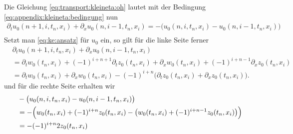 Die Gleichung \eqref{eq:transport:kleineta:oh} lautet mit der Bedingung \eqref{eq:appendix:kleineta:bedingung} nun
\begin{align*}
\partial_t u_0(n+1, i, t_n, x_i) + \partial_x u_0(n, i-1, t_n, x_i) = - \bigl( u_0(n, i, t_n, x_i) - u_0(n, i-1, t_n, x_i) \bigr)\\
\end{align*}
Setzt man \eqref{eq:ke:ansatz} für $u_0$ ein, so gilt für die linke Seite ferner
\begin{align}\label{eq:appendix:kleineta:oh:linkeseite}
&\partial_t u_0(n+1, i, t_n, x_i) + \partial_x u_0(n, i-1, t_n, x_i) \nonumber\\
&= \partial_t w_0(t_n,x_i) + (-1)^{i+n+1} \partial_t z_0(t_n,x_i)+ \partial_x w_0(t_n,x_i) + (-1)^{i+n-1} \partial_x z_0(t_n,x_i)\nonumber\\
&= \partial_t w_0(t_n,x_i) + \partial_x w_0(t_n,x_i) - (-1)^{i+n} \bigl( \partial_t z_0(t_n,x_i) + \partial_x z_0(t_n,x_i) \bigr).
\end{align}
und für die rechte Seite erhalten wir
\begin{align}\label{eq:appendix:kleineta:oh:rechteseite}
&- \bigl( u_0(n, i, t_n, x_i) - u_0(n, i-1, t_n, x_i) \bigr)\\
&= -\Bigl( w_0(t_n, x_i) + (-1)^{i+n} z_0(t_n, x_i) - \bigl( w_0(t_n, x_i) + (-1)^{i+n-1} z_0(t_n, x_i) \bigr) \Bigr) \nonumber\\
&= - (-1)^{i+n} 2 z_0(t_n,x_i) 
\end{align}

